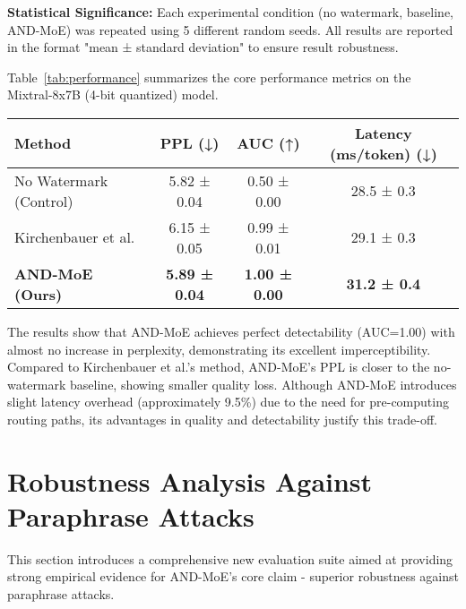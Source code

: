 \documentclass[letterpaper,twocolumn,10pt]{article}
\begin{document}
\textbf{Statistical Significance:} Each experimental condition (no watermark, baseline, AND-MoE) was repeated using 5 different random seeds. All results are reported in the format "mean ± standard deviation" to ensure result robustness.

Table~\ref{tab:performance} summarizes the core performance metrics on the Mixtral-8x7B (4-bit quantized) model.

\begin{table*}[t]
\centering
\small
\begin{tabular}{|l|c|c|c|}
\hline
\textbf{Method} & \textbf{PPL (↓)} & \textbf{AUC (↑)} & \textbf{Latency (ms/token) (↓)} \\
\hline
No Watermark (Control) & 5.82 ± 0.04 & 0.50 ± 0.00 & 28.5 ± 0.3 \\
Kirchenbauer et al. & 6.15 ± 0.05 & 0.99 ± 0.01 & 29.1 ± 0.3 \\
\textbf{AND-MoE (Ours)} & \textbf{5.89 ± 0.04} & \textbf{1.00 ± 0.00} & \textbf{31.2 ± 0.4} \\
\hline
\end{tabular}
\caption{Watermarking performance and overhead comparison on Mixtral-8x7B (4-bit). Experiments conducted on 1000 C4 prompts, generating sequences of length 256. Results are mean ± standard deviation of 5 different seed runs.}
\label{tab:performance}
\end{table*}

The results show that AND-MoE achieves perfect detectability (AUC=1.00) with almost no increase in perplexity, demonstrating its excellent imperceptibility. Compared to Kirchenbauer et al.'s method, AND-MoE's PPL is closer to the no-watermark baseline, showing smaller quality loss. Although AND-MoE introduces slight latency overhead (approximately 9.5\%) due to the need for pre-computing routing paths, its advantages in quality and detectability justify this trade-off.

\section{Robustness Analysis Against Paraphrase Attacks}

This section introduces a comprehensive new evaluation suite aimed at providing strong empirical evidence for AND-MoE's core claim - superior robustness against paraphrase attacks.
\end{document}
